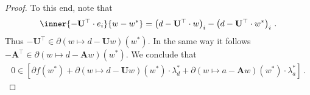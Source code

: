 \begin{proof}
To this end, note that
\begin{gather}
  \inner
  {
  -
\mathbf{U}^\top
\cdot e_i
}
  {w-w^*}
  =
  \left( 
    d-
\mathbf{U}^\top
\cdot w
  \right)_i
  -
  \left( 
    d-
\mathbf{U}^\top\cdot w^*
  \right)_i
  \,.
\end{gather}
Thus
$
-
\mathbf{U}^\top
\in
    \partial
    \left( 
      w
      \mapsto
      d
      -
      \mathbf{U}w
    \right)
    (w^*)
$.
In the same way it follows
$
-
\mathbf{A}^\top
\in
    \partial
    \left( 
      w
      \mapsto
      d
      -
      \mathbf{A}w
    \right)
    (w^*)
$.
We conclude that
\begin{gather}
  \mathrm{0}
  \in
  [
  \partial
  f(w^*)
  +
    \partial
    \left( 
      w
      \mapsto
      d
      -
      \mathbf{U}w
    \right)
    (w^*)
    \cdot
    \lambda_d^*
    +
    \partial
    \left( 
      w
      \mapsto
      a
      -
      \mathbf{A}w
    \right)
    (w^*)
    \cdot
    \lambda_a^*
  ]
  \,.
\end{gather}

\end{proof}
